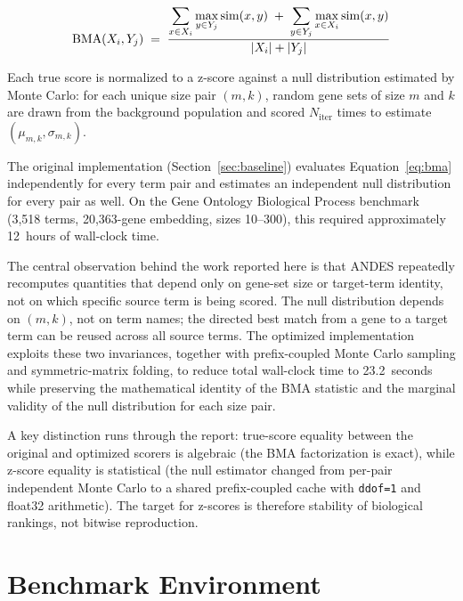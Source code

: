 \documentclass[11pt,a4paper]{article}
\begin{document}
\begin{equation}
	\label{eq:bma}
	\mathrm{BMA}(X_i, Y_j) \;=\;
	\frac{%
		\displaystyle\sum_{x \in X_i} \max_{y \in Y_j} \mathrm{sim}(x,y)
		\;+\;
		\displaystyle\sum_{y \in Y_j} \max_{x \in X_i} \mathrm{sim}(x,y)
	}{|X_i| + |Y_j|}
\end{equation}

Each true score is normalized to a z-score against a null distribution
estimated by Monte Carlo: for each unique size pair $(m,k)$, random gene sets
of size $m$ and $k$ are drawn from the background population and scored
$N_\text{iter}$ times to estimate $(\mu_{m,k}, \sigma_{m,k})$.

The original implementation (Section~\ref{sec:baseline}) evaluates
Equation~\ref{eq:bma} independently for every term pair and estimates an
independent null distribution for every pair as well. On the Gene Ontology
Biological Process benchmark (3{,}518 terms, 20{,}363-gene embedding, sizes
10--300), this required approximately 12~hours of wall-clock time.

The central observation behind the work reported here is that ANDES repeatedly
recomputes quantities that depend only on gene-set size or target-term
identity, not on which specific source term is being scored. The null
distribution depends on $(m,k)$, not on term names; the directed best match
from a gene to a target term can be reused across all source terms. The
optimized implementation exploits these two invariances, together with
prefix-coupled Monte Carlo sampling and symmetric-matrix folding, to reduce
total wall-clock time to 23.2~seconds while preserving the mathematical
identity of the BMA statistic and the marginal validity of the null
distribution for each size pair.

A key distinction runs through the report: true-score equality between
the original and optimized scorers is algebraic (the BMA factorization is
exact), while z-score equality is statistical (the null estimator changed
from per-pair independent Monte Carlo to a shared prefix-coupled cache with
\texttt{ddof=1} and float32 arithmetic). The target for z-scores is therefore
stability of biological rankings, not bitwise reproduction.

\section{Benchmark Environment}
\end{document}
